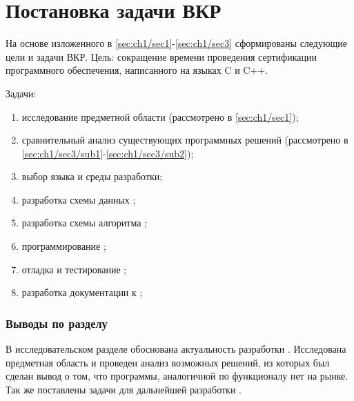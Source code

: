 \section{Постановка задачи ВКР}\label{sec:ch1/sec4}
На основе изложенного в \autoref{sec:ch1/sec1}-\autoref{sec:ch1/sec3} сформированы
следующие цели и задачи ВКР.
Цель: сокращение времени проведения сертификации программного обеспечения, написанного
на языках C и C++.

Задачи:
\begin{enumerate}
    \item исследование предметной области (рассмотрено в \autoref{sec:ch1/sec1});
    \item сравнительный анализ существующих программных решений 
        (рассмотрено в \autoref{sec:ch1/sec3/sub1}-\autoref{sec:ch1/sec3/sub2});
    \item выбор языка и среды разработки;
    \item разработка схемы данных {\ProgModule};
    \item разработка схемы алгоритма {\ProgModule};
    \item программирование {\ProgModule};
    \item отладка и тестирование {\ProgModule};
    \item разработка документации к {\ProgModule};
\end{enumerate}

\subsubsection{Выводы по разделу}\label{sec:ch1/sec5}
В исследовательском разделе обоснована актуальность разработки {\ProgModule}.
Исследована предметная область и проведен анализ возможных решений, из которых был сделан
вывод о том, что программы, аналогичной по функционалу {\ProgModule} нет на рынке.
Так же поставлены задачи для дальнейшей разработки {\ProgModule}.
